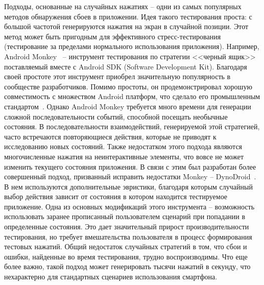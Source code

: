 Подходы, основанные на случайных нажатиях -- одни из самых популярных методов обнаружения сбоев в приложении. Идея такого тестирования проста: с большой частотой генерируются нажатия на экран в случайной позиции. Этот метод может быть пригодным для эффективного стресс-тестирования (тестирование за пределами нормального использования приложения). Например, Android Monkey~\cite{studio2017ui} -- инструмент тестирования по стратегии <<черный ящик>> поставляемый вместе с Android SDK (Software Development Kit). Благодаря своей простоте этот инструмент приобрел значительную популярность в сообществе разработчиков. Помимо простоты, он продемонстрировал хорошую совместимость с множеством Android платформ, что сделало его промышленным стандартом~\cite{wang2018empirical}. Однако Android Monkey требуется много времени для генерации сложной последовательности событий, способной посещать необычные состояния. В последовательности взаимодействий, генерируемой этой стратегией, часто встречаются повторяющиеся действия, которые не приводят к исследованию новых состояний. Также недостатком этого подхода являются многочисленные нажатия на неинтерактивные элементы, что вовсе не может изменить текущего состояния приложения. В связи с этим был разработан более совершенный подход, призванный исправить недостатки Monkey -- DynoDroid~\cite{machiry2013dynodroid}. В нем используются дополнительные эвристики, благодаря которым случайный выбор действия зависит от состояния в котором находится тестируемое приложение. Одна из основных модификаций этого инструмента -- возможность использовать заранее прописанный пользователем сценарий при попадании в определенные состояния. Это дает значительный прирост производительности тестирования, но требует вмешательства пользователя в процесс формирования тестовых нажатий. Общий недостаток случайных стратегий в том, что сбои и ошибки, найденные во время тестирования, трудно воспроизводимы. Что еще более важно, такой подход может генерировать тысячи нажатий в секунду, что нехарактерно для стандартных сценариев использования смартфона.

